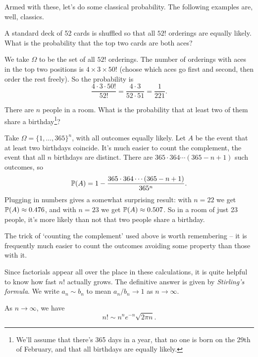\documentclass[a4paper]{scrartcl}
\begin{document}
Armed with these, let's do some classical probability. The following examples are, well, classics.

\begin{example}
	A standard deck of 52 cards is shuffled so that all $52!$ orderings are equally likely. What is the probability that the top two cards are both aces?

	We take $\Omega$ to be the set of all $52!$ orderings. The number of orderings with aces in the top two positions is $4 \times 3 \times 50!$ (choose which aces go first and second, then order the rest freely). So the probability is
	$$
	\frac{4 \cdot 3 \cdot 50!}{52!} = \frac{4 \cdot 3}{52 \cdot 51} = \frac{1}{221}.
	$$
\end{example}

\begin{example}
	There are $n$ people in a room. What is the probability that at least two of them share a birthday\footnote{We'll assume that there's 365 days in a year, that no one is born on the 29th of February, and that all birthdays are equally likely.}?

	Take $\Omega = \{1, \dots, 365\}^n$, with all outcomes equally likely. Let $A$ be the event that at least two birthdays coincide. It's much easier to count the complement, the event that all $n$ birthdays are distinct. There are $365 \cdot 364 \cdots (365 - n + 1)$ such outcomes, so
	$$
	\mathbb{P}(A) = 1 - \frac{365 \cdot 364 \cdots (365 - n + 1)}{365^n}.
	$$
	Plugging in numbers gives a somewhat surprising result: with $n = 22$ we get $\mathbb{P}(A) \approx 0.476$, and with $n = 23$ we get $\mathbb{P}(A) \approx 0.507$. So in a room of just 23 people, it's more likely than not that two people share a birthday.
\end{example}

The trick of `counting the complement' used above is worth remembering -- it is frequently much easier to count the outcomes avoiding some property than those with it.

Since factorials appear all over the place in these calculations, it is quite helpful to know how fast $n!$ actually grows. The definitive answer is given by \emph{Stirling's formula}. We write $a_n \sim b_n$ to mean $a_n / b_n \rightarrow 1$ as $n \rightarrow \infty$.

\begin{theorem}
	As $n \rightarrow \infty$, we have
	$$
	n! \sim n^n e^{-n} \sqrt{2 \pi n}.
	$$
\end{theorem}
\end{document}
